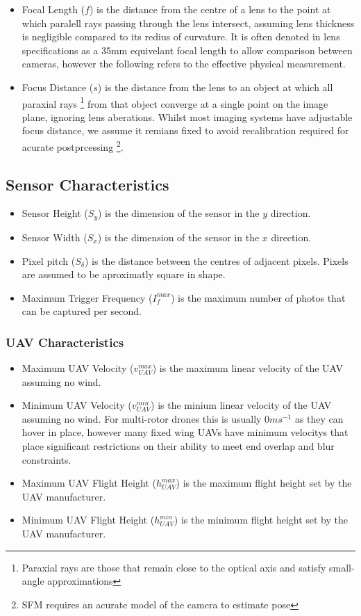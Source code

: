 \documentclass[11pt]{article}
\begin{document}
\begin{itemize}
    \item Focal Length ($f$) is the distance from the centre of a lens to the point at which paralell rays passing through the lens intersect, assuming lens thickness is negligible compared to its redius of curvature. It is often denoted in lens specifications as a 35mm equivelant focal length to allow comparison between cameras, however the following refers to the effective physical measurement. 
    \item Focus Distance ($s$) is the distance from the lens to an object at which all paraxial rays \footnote{Paraxial rays are those that remain close to the optical axis and satisfy small-angle approximations} from that object converge at a single point on the image plane, ignoring lens aberations. Whilst most imaging systems have adjustable focus distance, we assume it remians fixed to avoid recalibration required for acurate postprcessing \footnote{SFM requires an acurate model of the camera to estimate pose}. 
\end{itemize}

\subsection{Sensor Characteristics}

\begin{itemize}
    \item Sensor Height ($S_{y}$) is the dimension of the sensor in the $y$ direction.
    \item Sensor Width ($S_x$) is the dimension of the sensor in the $x$ direction.
    \item Pixel pitch ($S_\delta$) is the distance between the centres of adjacent pixels. Pixels are assumed to be aproximatly square in shape. 
    \item Maximum Trigger Frequency ($I_f^{max}$) is the maximum number of photos that can be captured per second. 
\end{itemize}

\subsubsection{UAV Characteristics}

\begin{itemize}
    \item Maximum UAV Velocity ($v_{UAV}^{max}$) is the maximum linear velocity of the UAV assuming no wind. 
    \item Minimum UAV Velocity ($v_{UAV}^{min}$) is the minium linear velocity of the UAV assuming no wind. For multi-rotor drones this is usually $0ms^{-1}$ as they can hover in place, however many fixed wing UAVs have minimum velocitys that place significant restrictions on their ability to meet end overlap and blur constraints. 
    \item Maximum UAV Flight Height ($h_{UAV}^{max}$) is the maximum flight height set by the UAV manufacturer. 
    \item Minimum UAV Flight Height ($h_{UAV}^{min}$) is the minimum flight height set by the UAV manufacturer. 
\end{itemize}
\end{document}
